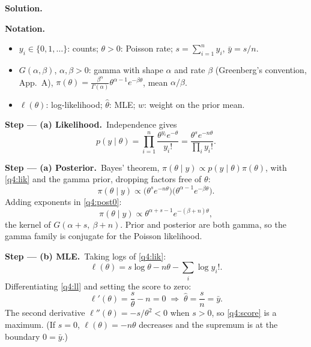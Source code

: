 \documentclass[11pt,a4paper]{article}
\numberwithin{equation}{questao}   %
\newenvironment{notacao}{\par\smallskip\noindent\textbf{Notation.}\begin{itemize}[leftmargin=1.4em,topsep=1pt,itemsep=0pt]\small}{\end{itemize}}
\newcommand{\passo}[2]{\par\smallskip\noindent\textbf{Step --- #1.}~#2}
\newcommand{\solhead}{\par\medskip\noindent{\color{blue!55!black}\rule{\linewidth}{0.3pt}}\par\noindent\textbf{Solution.}}
\begin{document}
\begin{sol}
\solhead
\begin{notacao}
\item $y_i\in\{0,1,\dots\}$: counts; $\theta>0$: Poisson rate; $s=\sum_{i=1}^ny_i$, $\bar y=s/n$.
\item $G(\alpha,\beta)$, $\alpha,\beta>0$: gamma with shape $\alpha$ and rate $\beta$ (Greenberg's
  convention, App.~A), $\pi(\theta)=\frac{\beta^\alpha}{\Gamma(\alpha)}\theta^{\alpha-1}e^{-\beta\theta}$,
  mean $\alpha/\beta$.
\item $\ell(\theta)$: log-likelihood; $\hat\theta$: MLE; $w$: weight on the prior mean.
\end{notacao}

\passo{(a) Likelihood}{Independence gives}
\begin{equation}\label{q4:lik}
p(y\mid\theta)=\prod_{i=1}^n\frac{\theta^{y_i}e^{-\theta}}{y_i!}=\frac{\theta^{s}e^{-n\theta}}{\prod_iy_i!}.
\end{equation}

\passo{(a) Posterior}{Bayes' theorem, $\pi(\theta\mid y)\propto p(y\mid\theta)\pi(\theta)$, with
\eqref{q4:lik} and the gamma prior, dropping factors free of $\theta$:}
\begin{equation}\label{q4:post0}
\pi(\theta\mid y)\propto\big(\theta^{s}e^{-n\theta}\big)\big(\theta^{\alpha-1}e^{-\beta\theta}\big).
\end{equation}
Adding exponents in \eqref{q4:post0}:
\begin{equation}\label{q4:post}
\pi(\theta\mid y)\propto\theta^{\alpha+s-1}e^{-(\beta+n)\theta},
\end{equation}
the kernel of $G(\alpha+s,\ \beta+n)$. Prior and posterior are both gamma, so the gamma family is
conjugate for the Poisson likelihood.

\passo{(b) MLE}{Taking logs of \eqref{q4:lik}:}
\begin{equation}\label{q4:ll}
\ell(\theta)=s\log\theta-n\theta-\sum_i\log y_i!.
\end{equation}
Differentiating \eqref{q4:ll} and setting the score to zero:
\begin{equation}\label{q4:score}
\ell'(\theta)=\frac{s}{\theta}-n=0\;\Longrightarrow\;\hat\theta=\frac{s}{n}=\bar y .
\end{equation}
The second derivative $\ell''(\theta)=-s/\theta^2<0$ when $s>0$, so \eqref{q4:score} is a maximum. (If
$s=0$, $\ell(\theta)=-n\theta$ decreases and the supremum is at the boundary $0=\bar y$.)


\end{sol}
\end{document}
